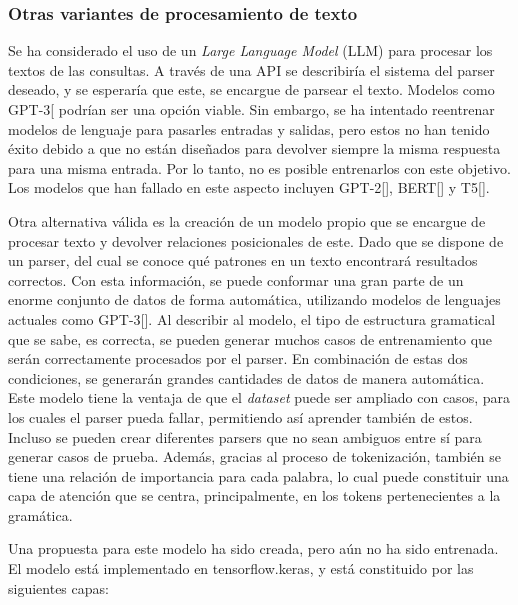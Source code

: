 \subsubsection{Otras variantes de procesamiento de texto }
Se ha considerado el uso de un \textit{Large Language Model} (LLM) para procesar los textos de las consultas. A través de una API se describiría el sistema del parser deseado, y se esperaría que este, se encargue de parsear el texto. Modelos como GPT-3[\cite{gpt3} podrían ser una opción viable. Sin embargo, se ha intentado reentrenar modelos de lenguaje para pasarles entradas y salidas, pero estos no han tenido éxito debido a que no están diseñados para devolver siempre la misma respuesta para una misma entrada. Por lo tanto, no es posible entrenarlos con este objetivo. Los modelos que han fallado en este aspecto incluyen GPT-2[\cite{gpt2}], BERT[\cite{bert}] y T5[\cite{t5}].

Otra alternativa v\'alida es la creación de un modelo propio que se encargue de procesar texto y devolver relaciones posicionales de este. Dado que se dispone de un parser, del cual se conoce qu\'e patrones en un texto encontrará resultados correctos. Con esta información, se puede conformar una gran parte de un enorme conjunto de datos de forma automática, utilizando modelos de lenguajes actuales como GPT-3[\cite{gpt3}]. Al describir al modelo, el tipo de estructura gramatical que se sabe, es correcta, se pueden generar muchos casos de entrenamiento que ser\'an correctamente procesados por el parser. En combinación de estas dos condiciones, se generarán grandes cantidades de datos de manera automática. Este modelo tiene la ventaja de que el \textit{dataset} puede ser ampliado con casos, para los cuales el parser pueda fallar, permitiendo así aprender tambi\'en de estos. Incluso se pueden crear diferentes parsers que no sean ambiguos entre sí para generar casos de prueba. Adem\'as, gracias al proceso de tokenizaci\'on, tambi\'en se tiene una relaci\'on de importancia para cada palabra, lo cual puede constituir una capa de atenci\'on que se centra, principalmente, en los tokens pertenecientes a la gram\'atica.

Una propuesta para este modelo ha sido creada, pero aún no ha sido entrenada. El modelo está implementado en tensorflow.keras, y est\'a constituido por las siguientes capas:

